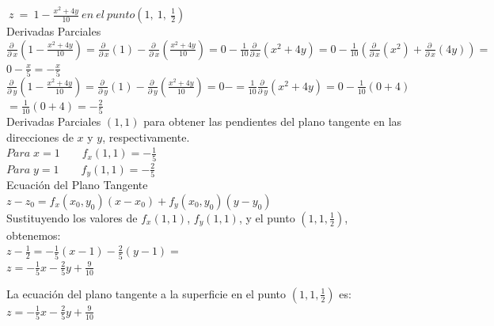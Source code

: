 \documentclass[13pt]{memoir}
\begin{document}
\begin{enumerate}
\clearpage 

$\:z\:=\:1-\frac{x^2+4y}{10}\:en\:el\:punto\left(1,\:1,\:\frac{1}{2}\right)$\\ 


{\tiny Derivadas Parciales}\\ 

$\frac{\partial \:}{\partial \:x}\left(1-\frac{x^2+4y}{10}\right) =\frac{\partial \:}{\partial \:x}\left(1\right)-\frac{\partial \:}{\partial \:x}\left(\frac{x^2+4y}{10}\right) = 0 -\frac{1}{10}\frac{\partial \:}{\partial \:x}\left(x^2+4y\right) = 0 -\frac{1}{10}\left(\frac{\partial \:}{\partial \:x}\left(x^2\right)+\frac{\partial \:}{\partial \:x}\left(4y\right)\right)=$\\
$0-\frac{x}{5} =-\frac{x}{5}$ \\ 


$\frac{\partial \:}{\partial \:y}\left(1-\frac{x^2+4y}{10}\right) =\frac{\partial \:}{\partial \:y}\left(1\right)-\frac{\partial \:}{\partial \:y}\left(\frac{x^2+4y}{10}\right) = 0 - =\frac{1}{10}\frac{\partial \:}{\partial \:y}\left(x^2+4y\right) = 0 -\frac{1}{10}\left(0+4\right)$\\ 
$=\frac{1}{10}\left(0+4\right) =-\frac{2}{5}$\\ 

{\tiny Derivadas Parciales \( (1, 1) \) para obtener las pendientes del plano tangente en las direcciones de \(x\) y \(y\), respectivamente.}\\ 

$Para \;x = 1 \qquad f_x(1, 1) = -\frac{1}{5}$\\ 

$Para \;y = 1 \qquad f_y(1, 1) = -\frac{2}{5}$\\ 

{\tiny Ecuación del Plano Tangente}\\ 
$z - z_0 = f_x(x_0, y_0)(x - x_0) + f_y(x_0, y_0)(y - y_0)$\\ 

{\tiny Sustituyendo los valores de \(f_x(1, 1)\), \(f_y(1, 1)\), y el punto \((1, 1, \frac{1}{2})\), obtenemos:}\\ 
$z - \frac{1}{2} = -\frac{1}{5}(x - 1) - \frac{2}{5}(y - 1) = $\\ 
$z = -\frac{1}{5}x - \frac{2}{5}y + \frac{9}{10}$

{\tiny La ecuación del plano tangente a la superficie en el punto \((1, 1, \frac{1}{2})\) es:}\\ 
$z = -\frac{1}{5}x - \frac{2}{5}y + \frac{9}{10}$



\end{enumerate}
\end{document}

